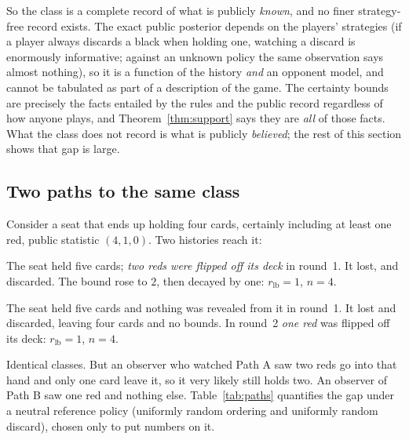 \documentclass[11pt]{article}
\theoremstyle{plain}
\theoremstyle{definition}
\theoremstyle{remark}
\newcommand{\rlb}{\ensuremath{r_{\mathrm{lb}}}}
\begin{document}
So the class is a complete record of what is publicly \emph{known}, and no
finer strategy-free record exists. The exact public posterior depends on
the players' strategies (if a player always discards a black when holding
one, watching a discard is enormously informative; against an unknown
policy the same observation says almost nothing), so it is a function of
the history \emph{and} an opponent model, and cannot be tabulated as part
of a description of the game. The certainty bounds are precisely the facts
entailed by the rules and the public record regardless of how anyone
plays, and Theorem~\ref{thm:support} says they are \emph{all} of those
facts. What the class does not record is what is publicly \emph{believed};
the rest of this section shows that gap is large.

\subsection{Two paths to the same class}

Consider a seat that ends up holding four cards, certainly including at
least one red, public statistic $(4,1,0)$. Two histories reach it:

\begin{description}\itemsep3pt
  \item[Path A (decay).] The seat held five cards; \emph{two reds were
        flipped off its deck} in round~1. It lost, and discarded. The bound
        rose to $2$, then decayed by one: $\rlb=1$, $n=4$.
  \item[Path B (fresh sighting).] The seat held five cards and nothing was
        revealed from it in round~1. It lost and discarded, leaving four
        cards and no bounds. In round~2 \emph{one red} was flipped off its
        deck: $\rlb=1$, $n=4$.
\end{description}

Identical classes. But an observer who watched Path A saw two reds go into
that hand and only one card leave it, so it very likely still holds two.
An observer of Path B saw one red and nothing else. Table~\ref{tab:paths}
quantifies the gap under a neutral reference policy (uniformly random
ordering and uniformly random discard), chosen only to put numbers on it.
\end{document}
